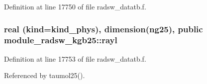 Definition at line 17750 of file radsw\+\_\+datatb.\+f.

\subsubsection[{\texorpdfstring{rayl}{rayl}}]{\setlength{\rightskip}{0pt plus 5cm}real (kind=kind\+\_\+phys), dimension(ng25), public module\+\_\+radsw\+\_\+kgb25\+::rayl}\hypertarget{namespacemodule__radsw__kgb25_a3d32a0d74d03129cacd9c4bb2e58683a}{}\label{namespacemodule__radsw__kgb25_a3d32a0d74d03129cacd9c4bb2e58683a}


Definition at line 17753 of file radsw\+\_\+datatb.\+f.



Referenced by taumol25().

